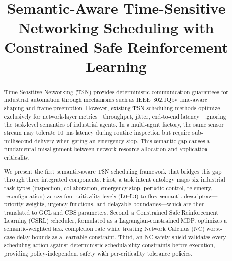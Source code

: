 \documentclass[conference]{IEEEtran}
\begin{document}
\title{Semantic-Aware Time-Sensitive Networking Scheduling with Constrained Safe Reinforcement Learning}

\author{
}

\maketitle

\begin{abstract}

Time-Sensitive Networking (TSN) provides deterministic communication guarantees for industrial automation through mechanisms such as IEEE~802.1Qbv time-aware shaping and frame preemption. However, existing TSN scheduling methods optimize exclusively for network-layer metrics---throughput, jitter, end-to-end latency---ignoring the task-level semantics of industrial agents. In a multi-agent factory, the same sensor stream may tolerate 10~ms latency during routine inspection but require sub-millisecond delivery when gating an emergency stop. This semantic gap causes a fundamental misalignment between network resource allocation and application-criticality.

We present the first semantic-aware TSN scheduling framework that bridges this gap through three integrated components. First, a task intent ontology maps six industrial task types (inspection, collaboration, emergency stop, periodic control, telemetry, reconfiguration) across four criticality levels (L0--L3) to flow semantic descriptors---priority weights, urgency functions, and delayable boundaries---which are then translated to GCL and CBS parameters. Second, a Constrained Safe Reinforcement Learning (CSRL) scheduler, formulated as a Lagrangian-constrained MDP, optimizes a semantic-weighted task completion rate while treating Network Calculus (NC) worst-case delay bounds as a learnable constraint. Third, an NC safety shield validates every scheduling action against deterministic schedulability constraints before execution, providing policy-independent safety with per-criticality tolerance policies.


\end{abstract}
\end{document}
